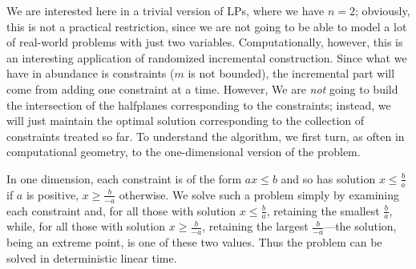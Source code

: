 \documentclass[11pt]{article}
\begin{document}
We are interested here in a trivial version of LPs, where we have $n=2$;
obviously, this is not a practical restriction, since we are not going to
be able to model a lot of real-world problems with just two variables.
Computationally, however, this is an interesting application of randomized
incremental construction.  Since what we have in abundance is constraints
($m$ is not bounded), the incremental part will come from adding one
constraint at a time.  However, We are \emph{not} going to build the
intersection of the halfplanes corresponding to the constraints; instead,
we will just maintain the optimal solution corresponding to the collection
of constraints treated so far.  To understand the algorithm, we first turn,
as often in computational geometry, to the one-dimensional version of the
problem.

In one dimension, each constraint is of the form $ax\leq b$ and so
has solution $x\leq \frac{b}{a}$ if $a$ is positive, $x\geq\frac{b}{-a}$
otherwise.   We solve such a problem simply by examining each constraint
and, for all those with solution $x\leq \frac{b}{a}$, retaining the
smallest $\frac{b}{a}$, while, for all those with solution $x\geq\frac{b}{-a}$,
retaining the largest $\frac{b}{-a}$---the solution, being an extreme point,
is one of these two values.  Thus the problem can be solved in deterministic
linear time.
\end{document}
